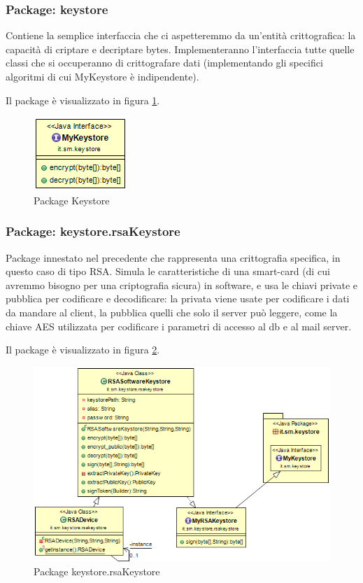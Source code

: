 \subsubsection{Package: \textbf{keystore}}

Contiene la semplice interfaccia che ci aspetteremmo da un’entità crittografica: la capacità di criptare e decriptare bytes. Implementeranno l’interfaccia tutte quelle classi che si occuperanno di crittografare dati (implementando gli specifici algoritmi di cui MyKeystore è indipendente).

Il package è visualizzato in figura \ref{gfx:dependencies_keystore}.

\begin{figure}[!htbp]
	\centering
	\includegraphics[scale = .5]{img/dependencies_keystore}
	\caption{Package Keystore}
	\label{gfx:dependencies_keystore}
\end{figure}

\subsubsection{Package: \textbf{keystore.rsaKeystore}}

Package innestato nel precedente che rappresenta una crittografia specifica, in questo caso di tipo RSA. Simula le caratteristiche di una smart-card (di cui avremmo bisogno per una criptografia sicura) in software, e usa le chiavi private e pubblica per codificare e decodificare: la privata viene usate per codificare i dati da mandare al client, la pubblica quelli che solo il server può leggere, come la chiave AES utilizzata per codificare i parametri di accesso al db e al mail server.


Il package è visualizzato in figura \ref{gfx:keystore.rsaKeystore}.

\begin{figure}[!htbp]
	\centering
	\includegraphics[scale = .5]{img/dependencies_rsakeystore.png}
	\caption{Package keystore.rsaKeystore}
	\label{gfx:keystore.rsaKeystore}
\end{figure}

